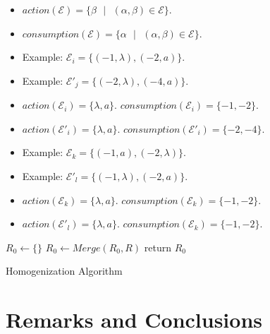 \documentclass[]{elsarticle}
\theoremstyle{definition}
\theoremstyle{definition}
\newcommand{\ee}{\mathcal{E}}
\newcommand{\se}{\text{ }}
\begin{document}
\begin{itemize}
\item $action(\ee) = \{ \beta \se|\se (\alpha,\beta) \in \ee\}$.
\item $consumption(\ee) = \{ \alpha \se|\se (\alpha,\beta) \in \ee\}$.
\item Example: $\ee_i = \{(-1,\lambda),(-2,a)\}$.
\item Example: $\ee'_j = \{(-2,\lambda),(-4,a)\}$.
\item $action(\ee_i)=\{\lambda, a\}$. $consumption(\ee_i)=\{-1,-2\}$.
\item $action(\ee'_i)=\{\lambda, a\}$. $consumption(\ee'_i)=\{-2,-4\}$.
\item Example: $\ee_k = \{(-1,a),(-2,\lambda)\}$.
\item Example: $\ee'_l = \{(-1,\lambda),(-2,a)\}$.
\item $action(\ee_k)=\{\lambda, a\}$. $consumption(\ee_k)=\{-1,-2\}$.
\item $action(\ee'_l)=\{\lambda, a\}$. $consumption(\ee_k)=\{-1,-2\}$.
\end{itemize}



\begin{algorithm}[H]
\SetAlgoLined
{}
$R_0 \leftarrow \{\}$\;
{
   $R_0 \leftarrow Merge(R_0,R)$\;
}
return $R_0$\;
\caption{Homogenization Algorithm}
\end{algorithm}


\section{Remarks and Conclusions}\label{sec-rem-con}







 
\end{document}
